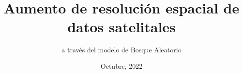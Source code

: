 \documentclass{beamer}
\title[About Beamer] %
{Aumento de resolución espacial de datos satelitales}
\subtitle{a través del modelo de Bosque Aleatorio}
\author[Palma Manterola, Matías] %
\institute[UFRO] %
{
  Facultad de Ingeniería y Ciencias\\
  Departamento de Ingeniería Matemática
  Universidad de La Frontera
}
\date[VLC 2021] %
{Octubre, 2022}
\begin{document}
  \frame{\titlepage}
\end{document}
